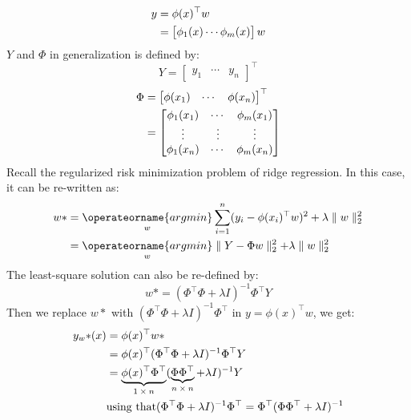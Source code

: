 \begin{align}
    y&=\phi(x)^\top w \notag\\
     &= \begin{bmatrix}
        \phi_1(x)\cdots\phi_m(x)
        \end{bmatrix} w
\end{align}
$Y$ and $\Phi$ in generalization is defined by:
\begin{equation}
    Y=\begin{bmatrix}
         y_1&\cdots&y_n
      \end{bmatrix}^\top 
\end{equation}
\begin{align}
    \Phi&=\begin{bmatrix}
           \phi(x_1)&\cdots&\phi(x_n) 
          \end{bmatrix}^\top \notag\\
        &=\begin{bmatrix}
           \phi_1(x_1)&\cdots&\phi_m(x_1)\\
           \vdots&\vdots&\vdots \\
           \phi_1(x_n)&\cdots&\phi_m(x_n)
          \end{bmatrix}
\end{align}
Recall the regularized risk minimization problem of ridge regression. In this case, it can be re-written as:
\begin{align*}
  w{*}&=\underset{w}{\operateorname{argmin}}\sum_{i=1}^n(y_i-\phi(x_i)^\top w)^2+\lambda\parallel w \parallel_2^2 \\
      &=\underset{w}{\operateorname{argmin}}\parallel Y-\Phi w\parallel_2^2+\lambda\parallel w\parallel_2^2
\end{align*}
The least-square solution can also be re-defined by:
\begin{equation}
    w{*}=(\Phi^\top\Phi+\lambda I)^{-1}\Phi^\top Y
\end{equation}
Then we replace $w{*}$ with $(\Phi^\top \Phi+\lambda I)^{-1}\Phi^\top$ in $y=\phi(x)^\top w$, we get:
\begin{align}
    y_w{*} (x)&=\phi(x)^\top w{*}\notag\\
            &=\phi(x)^\top(\Phi^\top \Phi+\lambda I)^{-1}\Phi^\top Y\notag\\
            &=\underbrace{\phi(x)^\top \Phi^\top}_\text{$1\times n$}(\underbrace{\Phi\Phi^\top}_\text{$n\times n$}+\lambda I)^{-1}Y\\
            &\text{using that} (\Phi^\top \Phi+\lambda I)^{-1}\Phi^\top=\Phi^\top(\Phi\Phi^\top+\lambda I)^{-1}\notag
\end{align}


